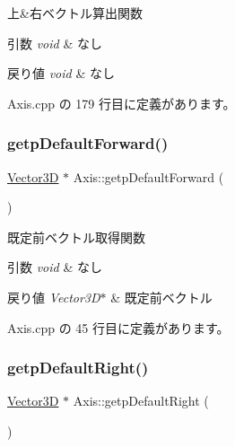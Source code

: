 上\&右ベクトル算出関数 


\begin{DoxyParams}{引数}
{\em void} & なし \\
\hline
\end{DoxyParams}

\begin{DoxyRetVals}{戻り値}
{\em void} & なし \\
\hline
\end{DoxyRetVals}


 Axis.\+cpp の 179 行目に定義があります。

\mbox{\label{class_axis_a71030c261074a737756e3f083da8d185}} 
\subsubsection{\texorpdfstring{getp\+Default\+Forward()}{getpDefaultForward()}}
{\footnotesize\ttfamily \mbox{\hyperlink{class_vector3_d}{Vector3D}} $\ast$ Axis\+::getp\+Default\+Forward (\begin{DoxyParamCaption}{ }\end{DoxyParamCaption})}



既定前ベクトル取得関数 


\begin{DoxyParams}{引数}
{\em void} & なし \\
\hline
\end{DoxyParams}

\begin{DoxyRetVals}{戻り値}
{\em Vector3\+D$\ast$} & 既定前ベクトル \\
\hline
\end{DoxyRetVals}


 Axis.\+cpp の 45 行目に定義があります。

\mbox{\label{class_axis_aa674343b016db11ac4e3ec2a149088e3}} 
\subsubsection{\texorpdfstring{getp\+Default\+Right()}{getpDefaultRight()}}
{\footnotesize\ttfamily \mbox{\hyperlink{class_vector3_d}{Vector3D}} $\ast$ Axis\+::getp\+Default\+Right (\begin{DoxyParamCaption}{ }\end{DoxyParamCaption})}



